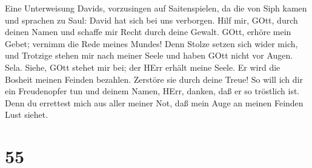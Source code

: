  Eine Unterweisung Davids, vorzusingen auf Saitenspielen,
 da die von Siph kamen und sprachen zu Saul: David hat sich
bei uns verborgen.  Hilf mir, GOtt, durch deinen Namen und
schaffe mir Recht durch deine Gewalt.  GOtt, erhöre mein
Gebet; vernimm die Rede meines Mundes!  Denn Stolze setzen
sich wider mich, und Trotzige stehen mir nach meiner Seele und haben
GOtt nicht vor Augen. Sela.  Siehe, GOtt stehet mir bei; der
HErr erhält meine Seele.  Er wird die Bosheit meinen Feinden
bezahlen. Zerstöre sie durch deine Treue!  So will ich dir
ein Freudenopfer tun und deinem Namen, HErr, danken, daß er so tröstlich
ist.  Denn du errettest mich aus aller meiner Not, daß mein
Auge an meinen Feinden Lust siehet.

\hypertarget{section-54}{%
\section{55}\label{section-54}}

